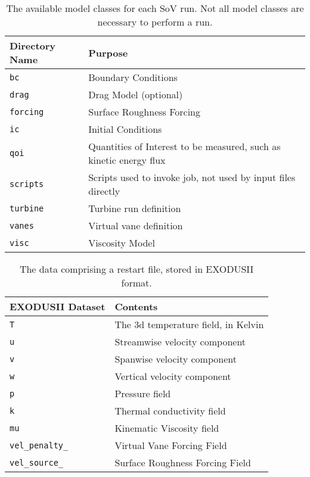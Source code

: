 \begin{table}
\centering
\caption{%
  The available model classes for each SoV run. Not all model classes
 are necessary to perform a run.\label{tbl:run}
}
\begin{small}
\begin{tabular}{p{}|p{}}
Directory Name & Purpose \\ \hline \hline
 \texttt{bc}       & Boundary Conditions \\
 \texttt{drag}       & Drag Model (optional) \\
 \texttt{forcing}       & Surface Roughness Forcing \\
 \texttt{ic}       & Initial Conditions \\
 \texttt{qoi}       & Quantities of Interest to be measured, such as
     kinetic energy flux \\
 \texttt{scripts}       & Scripts used to invoke job, not used by input
     files directly \\
 \texttt{turbine}       & Turbine run definition \\
 \texttt{vanes}       & Virtual vane definition \\
 \texttt{visc}       & Viscosity Model \\
\end{tabular}
\end{small}
\end{table}


\begin{table}
\centering
\caption[Instantaneous fields and other details comprising a restart file]{%
  The data comprising a restart file, stored in EXODUSII
 format.\label{tbl:EXO}
}
\begin{small}
\begin{tabular}{p{}|p{}}
EXODUSII Dataset & Contents \\ \hline \hline
\texttt{T                     } & The 3d temperature field, in Kelvin \\
\texttt{u                     } & Streamwise velocity component \\ 
\texttt{v                     } & Spanwise velocity component \\ 
\texttt{w                     } & Vertical velocity component \\ 
\texttt{p                     } & Pressure field \\ 
\texttt{k                     } & Thermal conductivity field \\ 
\texttt{mu                    } & Kinematic Viscosity field \\ 
\texttt{vel\_penalty\_        } & Virtual Vane Forcing Field \\ 
\texttt{vel\_source\_        }  & Surface Roughness Forcing Field 
\end{tabular}
\end{small}
\end{table}

